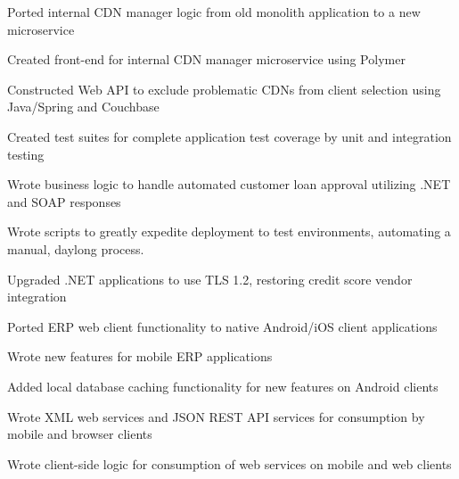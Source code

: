 \documentclass[line]{resume}
\begin{document}
\vspace{3px}

\begin{myitemize}
	\item Ported internal CDN manager logic from old monolith application to a new microservice
	\item Created front-end for internal CDN manager microservice using Polymer
	\item Constructed Web API to exclude problematic CDNs from client selection using Java/Spring and Couchbase
	\item Created test suites for complete application test coverage by unit and integration testing
\end{myitemize}

\vspace{3px}

\begin{myitemize}
	\item Wrote business logic to handle automated customer loan approval utilizing .NET and SOAP responses
	\item Wrote scripts to greatly expedite deployment to test environments, automating a manual, daylong process.
	\item Upgraded .NET applications to use TLS 1.2, restoring credit score vendor integration
\end{myitemize}

\vspace{3px}

\begin{myitemize}
	\item Ported ERP web client functionality to native Android/iOS client applications
	\item Wrote new features for mobile ERP applications
	\item Added local database caching functionality for new features on Android clients
	\item Wrote XML web services and JSON REST API services for consumption by mobile and browser clients
	\item Wrote client-side logic for consumption of web services on mobile and web clients
\end{myitemize}
\end{document}
